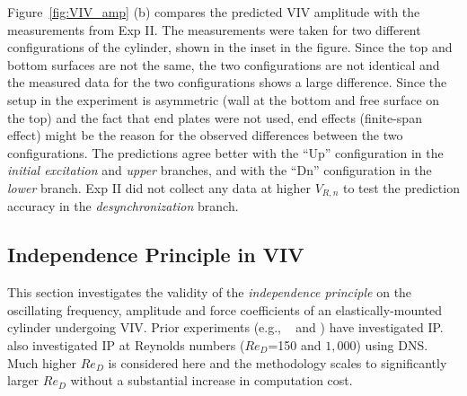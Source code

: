 Figure~\ref{fig:VIV_amp} (b) compares the predicted VIV amplitude with the
measurements from Exp II. The measurements were taken for two different
configurations of the cylinder, shown in the inset in the figure. Since the top
and bottom surfaces are not the same, the two configurations are not identical
and the measured data for the two configurations shows a large difference.
Since the setup in the experiment is asymmetric (wall at the bottom and free
surface on the top) and the fact that end plates were not used, end effects
(finite-span effect) might be the reason for the observed differences between
the two configurations. The predictions agree better with the ``Up''
configuration in the {\em initial excitation} and {\em upper} branches, and
with the ``Dn'' configuration in the {\em lower} branch. Exp II did not collect
any data at higher $V_{R,n}$ to test the prediction accuracy in the {\em
desynchronization} branch.

\subsection{Independence Principle in VIV}
\label{sec:IPinVIV}
%
This section investigates the validity of the {\em independence principle} on
the oscillating frequency, amplitude and force coefficients of an
elastically-mounted cylinder undergoing VIV. Prior experiments (e.g.,
~\citet{jain2013vortex} and \citet{franzini2013one}) have investigated IP.
\citet{zhao2015validity} also investigated IP at Reynolds numbers ($Re_D$=150
and $1,000$) using DNS. Much higher $Re_D$ is considered here and the
methodology scales to significantly larger $Re_D$ without a substantial
increase in computation cost.

